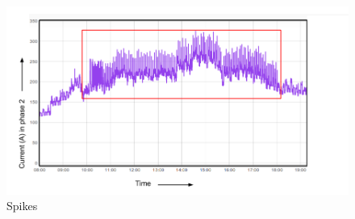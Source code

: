 \begin{figure} 
	\centering
	\includegraphics[width=1\linewidth]{images/spike4_new}
	\caption[Spikes]{Spikes}
	\label{fig:spike4}
	\vspace*{-3ex}
\end{figure}

